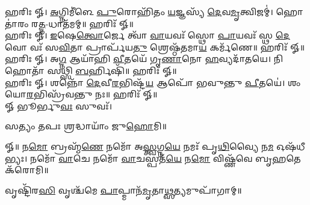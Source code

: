 𑌹𑌰𑌿𑌃 𑍐। \ul{𑌅}\-𑌗𑍍𑌨𑌿𑌮𑍀॑𑌳𑍇 \ul{𑌪𑍁}\-𑌰𑍋𑌹𑌿᳴𑌤𑌂 \ul{𑌯}\-𑌜𑍍𑌞𑌸𑍍𑌯᳴ \ul{𑌦𑍇}\-𑌵\-\ul{𑌮𑍃}\-𑌤𑍍𑌵𑌿𑌜𑌮𑍍॑। 𑌹𑍋𑌤𑌾॑𑌰𑌂 𑌰\-\ul{𑌤𑍍𑌨}\--𑌧𑌾𑌤᳴𑌮𑌮𑍍॥ 𑌹𑌰𑌿𑌃᳴ 𑍐॥\\

𑌹𑌰𑌿𑌃 𑍐। \ul{𑌇}\-𑌷𑍇\-\ul{𑌤𑍍𑌵𑍋}\-𑌰𑍍𑌜𑍇 𑌤𑍍𑌵𑌾᳴ \ul{𑌵𑌾}\-𑌯𑌵𑌃᳴ 𑌸𑍍𑌥𑍋 \ul{𑌪𑌾}\-𑌯𑌵𑌃᳴ 𑌸𑍍𑌥 \ul{𑌦𑍇}\-𑌵𑍋 𑌵𑌃᳴ 𑌸\-\ul{𑌵𑌿}\-𑌤𑌾 𑌪𑍍𑌰𑌾𑌰𑍍𑌪᳴𑌯\-\ul{𑌤𑍁} 𑌶𑍍𑌰𑍇𑌷𑍍𑌠᳴𑌤𑌮𑌾\-\ul{𑌯} 𑌕𑌰𑍍𑌮᳴𑌣𑍇॥ 𑌹𑌰𑌿𑌃᳴ 𑍐॥ \\

𑌹𑌰𑌿𑌃 𑍐। 𑌅\-\ul{𑌗𑍍𑌨} 𑌆𑌯𑌾᳴𑌹𑌿 \ul{𑌵𑍀}\-𑌤𑌯𑍇᳴ 𑌗𑍃\-\ul{𑌣𑌾}\-𑌨𑍋 \ul{𑌹}\-𑌵𑍍𑌯𑌦𑌾᳴𑌤𑌯𑍇। 𑌨𑌿 𑌹𑍋𑌤𑌾᳴ 𑌸𑌥𑍍𑌸𑌿 \ul{𑌬}\-𑌰𑍍𑌹𑌿𑌷𑌿᳴॥ 𑌹𑌰𑌿𑌃᳴ 𑍐॥\\

𑌹𑌰𑌿𑌃 𑍐। 𑌶𑌨𑍍𑌨𑍋᳴ \ul{𑌦𑍇}\-𑌵𑍀\-\ul{𑌰}\-𑌭𑌿𑌷𑍍𑌟᳴\-\ul{𑌯} 𑌆𑌪𑍋᳴ 𑌭𑌵𑍁𑌨𑍍𑌤𑍁 \ul{𑌪𑍀}\-𑌤𑌯𑍇॑। 𑌶𑌂 𑌯𑍋\-\ul{𑌰}\-𑌭𑌿𑌸𑍍𑌰᳴𑌵𑌨𑍍𑌤𑍁 𑌨𑌃॥ 𑌹𑌰𑌿𑌃᳴ 𑍐॥\\

𑍐 𑌭𑍂𑌰𑍍𑌭𑍁\-\ul{𑌵𑌃} 𑌸𑍁𑌵𑌃᳴।

𑌸𑌤𑍍𑌯𑌂 𑌤𑌪𑌃 𑌶𑍍𑌰𑌦𑍍𑌧𑌾𑌯𑌾𑌂᳴ 𑌜𑍁\-\ul{𑌹𑍋}\-𑌮𑌿॥


𑍐॥ 𑌨\-\ul{𑌮𑍋} 𑌬𑍍𑌰𑌹𑍍𑌮᳴\-\ul{𑌣𑍇} 𑌨𑌮𑍋᳴ 𑌅\-\ul{𑌸𑍍𑌤𑍍𑌵}\-𑌗𑍍𑌨\-\ul{𑌯𑍇} 𑌨𑌮𑌃᳴ 𑌪𑍃\-\ul{𑌥𑌿}\-𑌵𑍍𑌯𑍈 𑌨\-\ul{𑌮} 𑌓𑌷᳴𑌧𑍀𑌭𑍍𑌯𑌃।
𑌨𑌮𑍋᳴ \ul{𑌵𑌾}\-𑌚𑍇 𑌨𑌮𑍋᳴ \ul{𑌵𑌾}\-𑌚𑌸𑍍𑌪𑌤᳴\-\ul{𑌯𑍇} 𑌨\-\ul{𑌮𑍋} 𑌵𑌿𑌷𑍍𑌣᳴𑌵𑍇 𑌬𑍃\-\ul{𑌹}\-𑌤𑍇 𑌕᳴𑌰𑍋𑌮𑌿॥

𑌵𑍃𑌷𑍍𑌟𑌿᳴𑌰\-\ul{𑌸𑌿} 𑌵𑍃𑌶𑍍𑌚᳴𑌮𑍇 \ul{𑌪𑌾}\-𑌪𑍍𑌮𑌾𑌨᳴\-\ul{𑌮𑍃}\-𑌤𑌾\-\ul{𑌥𑍍𑌸}\-𑌤𑍍𑌯𑌮𑍁𑌪𑌾᳴𑌗𑌾𑌮𑍍॥
